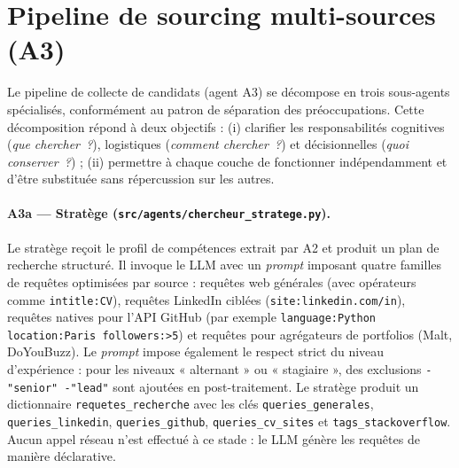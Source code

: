 
\section{Pipeline de sourcing multi-sources (A3)}

Le pipeline de collecte de candidats (agent A3) se décompose en trois sous-agents spécialisés, conformément au patron de séparation des préoccupations. Cette décomposition répond à deux objectifs : (i) clarifier les responsabilités cognitives (\textit{que chercher~?}), logistiques (\textit{comment chercher~?}) et décisionnelles (\textit{quoi conserver~?}) ; (ii) permettre à chaque couche de fonctionner indépendamment et d'être substituée sans répercussion sur les autres.

\paragraph{A3a — Stratège (\texttt{src/agents/chercheur\_stratege.py}).}
Le stratège reçoit le profil de compétences extrait par A2 et produit un plan de recherche structuré. Il invoque le LLM avec un \textit{prompt} imposant quatre familles de requêtes optimisées par source : requêtes web générales (avec opérateurs comme \texttt{intitle:CV}), requêtes LinkedIn ciblées (\texttt{site:linkedin.com/in}), requêtes natives pour l'API GitHub (par exemple \texttt{language:Python location:Paris followers:>5}) et requêtes pour agrégateurs de portfolios (Malt, DoYouBuzz). Le \textit{prompt} impose également le respect strict du niveau d'expérience : pour les niveaux « alternant » ou « stagiaire », des exclusions \texttt{-"senior" -"lead"} sont ajoutées en post-traitement. Le stratège produit un dictionnaire \texttt{requetes\_recherche} avec les clés \texttt{queries\_generales}, \texttt{queries\_linkedin}, \texttt{queries\_github}, \texttt{queries\_cv\_sites} et \texttt{tags\_stackoverflow}. Aucun appel réseau n'est effectué à ce stade : le LLM génère les requêtes de manière déclarative.

